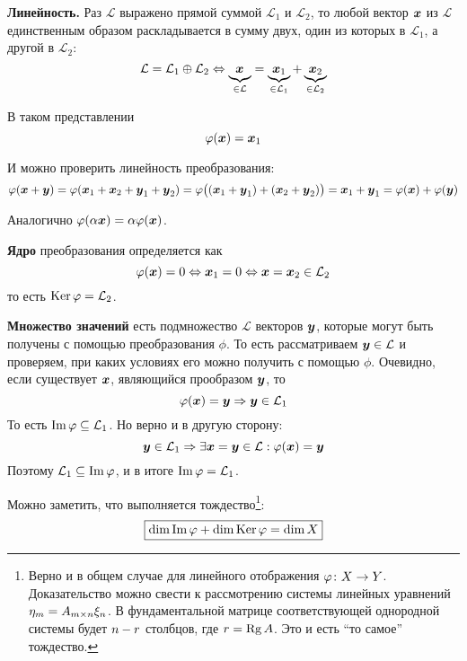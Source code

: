 \documentclass[a4paper,12pt]{article}
\DeclareMathOperator{\Imag}{Im}
\begin{document}
  \begin{solution}
    \textbf{Линейность.} Раз $\mathcal L$ выражено прямой суммой $\mathcal L_1$ и $\mathcal L_2$, то любой вектор $\boldsymbol x$ из $\mathcal L$ единственным образом раскладывается в сумму двух, один из которых в $\mathcal L_1$, а другой в $\mathcal L_2$:
    \[
      \mathcal L = \mathcal L_1 \oplus \mathcal L_2
      \Leftrightarrow \underbrace{\boldsymbol x_{\vphantom{1}}}_{\in \mathcal L} = \underbrace{\boldsymbol x_1}_{\in \mathcal L_1} + \underbrace{\boldsymbol x_2}_{\in \mathcal L_2} 
    \]  %
    
    В таком представлении
    \[
      \varphi(\boldsymbol x) = \boldsymbol x_1
    \]
    
    И можно проверить линейность преобразования:
    \[
      \varphi(\boldsymbol x + \boldsymbol y) = \varphi(\boldsymbol x_1 + \boldsymbol x_2 + \boldsymbol y_1 + \boldsymbol y_2)
      = \varphi\bigl((\boldsymbol x_1 + \boldsymbol y_1) + (\boldsymbol x_2 + \boldsymbol y_2)\bigr)
      = \boldsymbol x_1 + \boldsymbol y_1 = \varphi(\boldsymbol x) + \varphi(\boldsymbol y)
    \]
    
    Аналогично $\phi(\alpha \bds x) \hm= \alpha \phi(\bds x)$.
    
    \medskip
    
    \textbf{Ядро} преобразования определяется как
    \[
      \varphi(\boldsymbol x) = 0 \Leftrightarrow \boldsymbol x_1 = 0 \Leftrightarrow \boldsymbol x = \boldsymbol x_2 \in \mathcal L_2
    \]
    то есть $\Ker\phi \hm= \mathcal L_2$.
    
    \medskip
    
    \textbf{Множество значений} есть подмножество $\mathcal L$ векторов $\boldsymbol y$, которые могут быть получены с помощью преобразования $\phi$.
    То есть рассматриваем $\bds y \hm\in \mathcal L$ и проверяем, при каких условиях его можно получить с помощью $\phi$.
    Очевидно, если существует $\boldsymbol x$, являющийся прообразом $\boldsymbol y$, то
    \[
      \varphi(\boldsymbol x) = \boldsymbol y \Rightarrow \boldsymbol y \in \mathcal L_1
    \]
    То есть $\Imag\phi \hm{\subseteq} \mathcal L_1$.
    Но верно и в другую сторону:
    \[
      \boldsymbol y \in \mathcal L_1 \Rightarrow \exists \boldsymbol x = \boldsymbol y \in \mathcal L: \varphi(\boldsymbol x) = \boldsymbol y
    \]
    Поэтому $\mathcal L_1 \hm{\subseteq} \Imag\phi$, и в итоге $\Imag\phi \hm= \mathcal L_1$.
    
    Можно заметить, что выполняется тождество\footnote{Верно и в общем случае для линейного отображения $\phi \colon X \hm\to Y$. Доказательство можно свести к рассмотрению системы линейных уравнений $\eta_m \hm= A_{m\times n} \xi_n$. В фундаментальной матрице соответствующей однородной системы будет $n \hm- r$ столбцов, где $r \hm= \Rg A$. Это и есть ``то самое'' тождество.}:
    \[
      \boxed{\dim\Imag\phi + \dim\Ker\phi = \dim X}
    \]
    

\end{solution}
\end{document}
